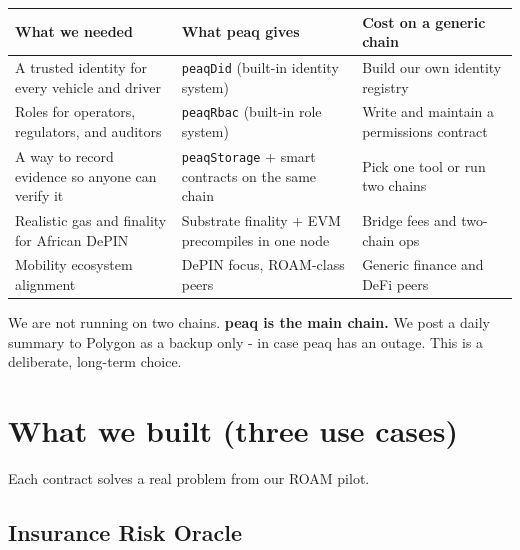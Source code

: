 \documentclass[11pt,a4paper]{article}
\begin{document}
\begin{center}
\begin{tabular}{p{3.6cm} p{5cm} p{6cm}}
\toprule
{\bfseries\color{axiprimary}What we needed} & {\bfseries\color{axiprimary}What peaq gives} & {\bfseries\color{axiprimary}Cost on a generic chain} \\
\midrule
A trusted identity for every vehicle and driver & \texttt{peaqDid} (built-in identity system) & Build our own identity registry \\
\addlinespace[2pt]
Roles for operators, regulators, and auditors & \texttt{peaqRbac} (built-in role system) & Write and maintain a permissions contract \\
\addlinespace[2pt]
A way to record evidence so anyone can verify it & \texttt{peaqStorage} + smart contracts on the same chain & Pick one tool or run two chains \\
\addlinespace[2pt]
Realistic gas and finality for African DePIN & Substrate finality + EVM precompiles in one node & Bridge fees and two-chain ops \\
\addlinespace[2pt]
Mobility ecosystem alignment & DePIN focus, ROAM-class peers & Generic finance and DeFi peers \\
\bottomrule
\end{tabular}
\end{center}

\vspace{8pt}

\begin{infobox}[title=Strategic lock]
We are not running on two chains. \textbf{peaq is the main chain.} We post a daily summary to Polygon as a backup only - in case peaq has an outage. This is a deliberate, long-term choice.
\end{infobox}

\section{What we built (three use cases)}

Each contract solves a real problem from our ROAM pilot.

\subsection{Insurance Risk Oracle}
\end{document}
